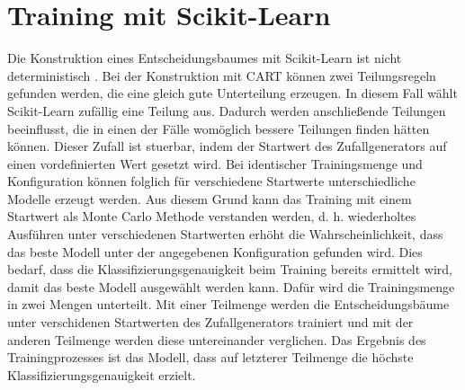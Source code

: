 \section{Training mit Scikit-Learn}
Die Konstruktion eines Entscheidungsbaumes mit Scikit-Learn ist nicht deterministisch \cite{dymelThesis}.
Bei der Konstruktion mit CART können zwei Teilungsregeln gefunden werden, die eine gleich gute Unterteilung erzeugen.
In diesem Fall wählt Scikit-Learn zufällig eine Teilung aus.
Dadurch werden anschließende Teilungen beeinflusst, die in einen der Fälle womöglich bessere Teilungen finden hätten können.
Dieser Zufall ist stuerbar, indem der Startwert des Zufallgenerators auf einen vordefinierten Wert gesetzt wird.
\newline
\newline
Bei identischer Trainingsmenge und Konfiguration können folglich für verschiedene Startwerte unterschiedliche Modelle erzeugt werden.
Aus diesem Grund kann das Training mit einem Startwert als Monte Carlo Methode verstanden werden, d. h. wiederholtes Ausführen unter verschiedenen Startwerten erhöht die Wahrscheinlichkeit, dass das
beste Modell unter der angegebenen Konfiguration gefunden wird.
\newline
\newline
Dies bedarf, dass die Klassifizierungsgenauigkeit beim Training bereits ermittelt wird, damit das beste Modell ausgewählt werden kann.
Dafür wird die Trainingsmenge in zwei Mengen unterteilt. Mit einer Teilmenge werden die Entscheidungsbäume unter verschidenen Startwerten des Zufallgenerators trainiert und
mit der anderen Teilmenge werden diese untereinander verglichen. Das Ergebnis des Trainingprozesses ist das Modell, dass auf letzterer Teilmenge die höchste
Klassifizierungsgenauigkeit erzielt.